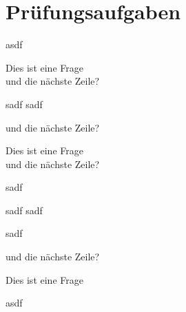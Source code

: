 \documentclass[a4paper,12pt]{article}
\begin{document}
\section{Prüfungsaufgaben}

asdf

\begin{question}
	Dies ist eine Frage\\
	und die nächste Zeile?
\begin{subsubparts}
	\subsubpart sadf
	\subsubpart sadf
\end{subsubparts}
	und die nächste Zeile?
\end{question}

\begin{question}
	Dies ist eine Frage\\
	und die nächste Zeile?
\begin{subparts}
	\subpart sadf
	\begin{subsubparts}
	\subsubpart sadf
	\subsubpart sadf
	\end{subsubparts}
	\subpart sadf
\end{subparts}
	und die nächste Zeile?
\end{question}

\begin{question}
	Dies ist eine Frage
\end{question}

\noindent asdf 
\end{document}
